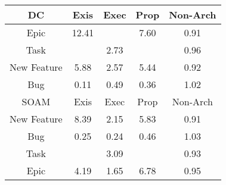\begin{tabular}{|c||c|c|c|c|}
\hline
\hline
DC & Exis & Exec & Prop & Non-Arch \\ 
\hline
Epic & \cellcolor[rgb]{0.8178998431547693,0.7963736099154171,0.42000000000000004} 12.41 &  & \cellcolor[rgb]{0.8567430340424214,0.8147730161253575,0.42} 7.60 & \cellcolor[rgb]{0.8948998162864931,0.7685257970894,0.4059064952007268} 0.91 \\ 
\hline
Task &  & \cellcolor[rgb]{0.8960691091413071,0.8334011569616717,0.42} 2.73 &  & \cellcolor[rgb]{0.9033064668874479,0.8083172766005862,0.4137527024282846} 0.96 \\ 
\hline
New Feature & \cellcolor[rgb]{0.8706437736510508,0.8213575769926029,0.42} 5.88 & \cellcolor[rgb]{0.8973250557045942,0.8339960790179657,0.42} 2.57 & \cellcolor[rgb]{0.8741624071773971,0.8230242981366618,0.42} 5.44 & \cellcolor[rgb]{0.8971791407622741,0.7793145996080971,0.40803386471145575} 0.92 \\ 
\hline
Bug & \cellcolor[rgb]{0.76,0.13,0.28} 0.11 & \cellcolor[rgb]{0.8234920517757744,0.43052904507199874,0.3392592483240561} 0.49 & \cellcolor[rgb]{0.8014618089282054,0.3262525622601721,0.3186976883329917} 0.36 & \cellcolor[rgb]{0.9098515530772022,0.8399296830365695,0.42} 1.02 \\ 
\hline
\hline
SOAM & Exis & Exec & Prop & Non-Arch \\ 
\hline
New Feature & \cellcolor[rgb]{0.8503171586023445,0.8117291803905843,0.42} 8.39 & \cellcolor[rgb]{0.900754382411826,0.8356204969319176,0.42} 2.15 & \cellcolor[rgb]{0.8709867675140601,0.8215200477698179,0.42} 5.83 & \cellcolor[rgb]{0.8952489116341371,0.7701781817349154,0.40623231752519456} 0.91 \\ 
\hline
Bug & \cellcolor[rgb]{0.7825216017827757,0.23660224843847197,0.3010201616639241} 0.25 & \cellcolor[rgb]{0.7810524436834354,0.22964823343492735,0.299648947437873} 0.24 & \cellcolor[rgb]{0.8193469414828618,0.4109088563522125,0.33539047871733774} 0.46 & \cellcolor[rgb]{0.9097514901844254,0.8398822848242014,0.42} 1.03 \\ 
\hline
Task &  & \cellcolor[rgb]{0.8931205304828153,0.8320044618076493,0.42} 3.09 &  & \cellcolor[rgb]{0.898227267468074,0.7842757326822166,0.4090121163035357} 0.93 \\ 
\hline
Epic & \cellcolor[rgb]{0.8842452711932522,0.8278003916178563,0.42} 4.19 & \cellcolor[rgb]{0.9047393114085202,0.83750809487772,0.42} 1.65 & \cellcolor[rgb]{0.8633552727484628,0.8179051291966403,0.42} 6.78 & \cellcolor[rgb]{0.9011202740255431,0.797969297054237,0.4117122557571735} 0.95 \\ 

\end{tabular}
